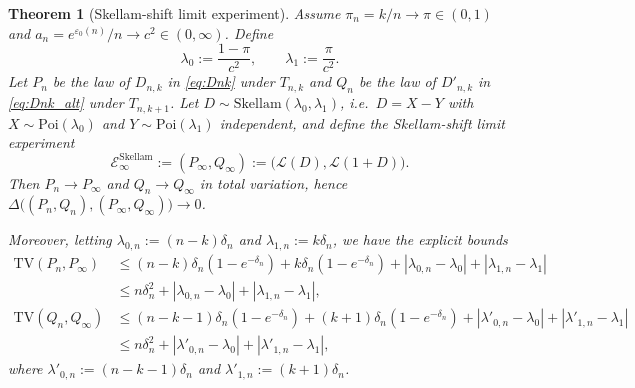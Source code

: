 \documentclass{article}
\newtheorem{theorem}{Theorem}[section]
\begin{document}
\begin{theorem}[Skellam-shift limit experiment]
\label{thm:skellam-shift}
Assume $\pi_n = k/n \to \pi \in (0,1)$ and $a_n = e^{\varepsilon_0(n)}/n \to c^2 \in (0, \infty)$. Define
\[
\lambda_0 := \frac{1 - \pi}{c^2}, \qquad \lambda_1 := \frac{\pi}{c^2}.
\]
Let $P_n$ be the law of $D_{n,k}$ in \eqref{eq:Dnk} under $T_{n,k}$ and $Q_n$ be the law of $D'_{n,k}$ in \eqref{eq:Dnk_alt} under $T_{n,k+1}$. Let
$D \sim \mathrm{Skellam}(\lambda_0, \lambda_1)$, i.e.\ $D = X - Y$ with $X \sim \mathrm{Poi}(\lambda_0)$ and $Y \sim \mathrm{Poi}(\lambda_1)$ independent, and define
the Skellam-shift limit experiment
\[
\mathcal{E}^{\mathrm{Skellam}}_\infty := (P_\infty, Q_\infty) := \bigl(\mathcal{L}(D), \mathcal{L}(1 + D)\bigr).
\]
Then $P_n \to P_\infty$ and $Q_n \to Q_\infty$ in total variation, hence $\Delta\bigl((P_n, Q_n), (P_\infty, Q_\infty)\bigr) \to 0$.

Moreover, letting $\lambda_{0,n} := (n-k)\delta_n$ and $\lambda_{1,n} := k\delta_n$, we have the explicit bounds
\begin{align}
\mathrm{TV}(P_n, P_\infty) &\leq (n-k)\delta_n(1-e^{-\delta_n}) + k\delta_n(1-e^{-\delta_n}) + |\lambda_{0,n} - \lambda_0| + |\lambda_{1,n} - \lambda_1| \nonumber\\
&\leq n\delta_n^2 + |\lambda_{0,n} - \lambda_0| + |\lambda_{1,n} - \lambda_1|, \label{eq:TVPn_Sk}\\
\mathrm{TV}(Q_n, Q_\infty) &\leq (n-k-1)\delta_n(1-e^{-\delta_n}) + (k+1)\delta_n(1-e^{-\delta_n}) + |\lambda'_{0,n} - \lambda_0| + |\lambda'_{1,n} - \lambda_1| \nonumber\\
&\leq n\delta_n^2 + |\lambda'_{0,n} - \lambda_0| + |\lambda'_{1,n} - \lambda_1|, \label{eq:TVQn_Sk}
\end{align}
where $\lambda'_{0,n} := (n-k-1)\delta_n$ and $\lambda'_{1,n} := (k+1)\delta_n$.
\end{theorem}
\end{document}
